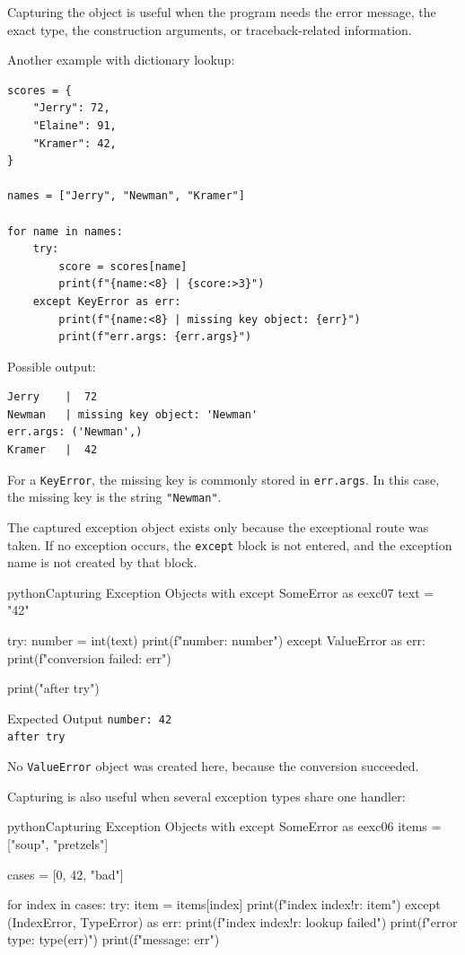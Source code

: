 Capturing the object is useful when the program needs the error message, the exact type, the construction arguments, or traceback-related information.

Another example with dictionary lookup:

\begin{verbatim}
scores = {
    "Jerry": 72,
    "Elaine": 91,
    "Kramer": 42,
}

names = ["Jerry", "Newman", "Kramer"]

for name in names:
    try:
        score = scores[name]
        print(f"{name:<8} | {score:>3}")
    except KeyError as err:
        print(f"{name:<8} | missing key object: {err}")
        print(f"err.args: {err.args}")
\end{verbatim}

Possible output:

\begin{verbatim}
Jerry    |  72
Newman   | missing key object: 'Newman'
err.args: ('Newman',)
Kramer   |  42
\end{verbatim}

For a \texttt{KeyError}, the missing key is commonly stored in \texttt{err.args}. In this case, the missing key is the string \texttt{"Newman"}.

The captured exception object exists only because the exceptional route was taken. If no exception occurs, the \texttt{except} block is not entered, and the exception name is not created by that block.

\begin{codebox}[]{python}{Capturing Exception Objects with except SomeError as e}{exc07}
text = "42"

try:
    number = int(text)
    print(f"number: {number}")
except ValueError as err:
    print(f"conversion failed: {err}")

print("after try")
\end{codebox}


\begin{iobox}{Expected Output}
\texttt{number: 42} \\
\texttt{after try} \\
\end{iobox}


No \texttt{ValueError} object was created here, because the conversion succeeded.

Capturing is also useful when several exception types share one handler:

\begin{codebox}[]{python}{Capturing Exception Objects with except SomeError as e}{exc06}
items = ["soup", "pretzels"]

cases = [0, 42, "bad"]

for index in cases:
    try:
        item = items[index]
        print(f"index {index!r}: {item}")
    except (IndexError, TypeError) as err:
        print(f"index {index!r}: lookup failed")
        print(f"error type: {type(err)}")
        print(f"message: {err}")
\end{codebox}


